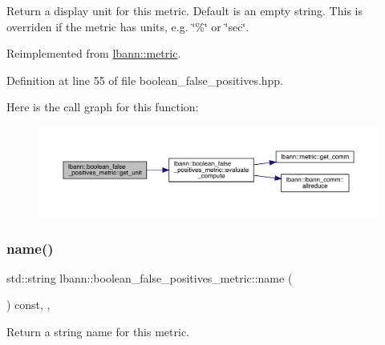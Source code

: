 Return a display unit for this metric. Default is an empty string. This is overriden if the metric has units, e.\+g. \char`\"{}\%\char`\"{} or \char`\"{}sec\char`\"{}. 

Reimplemented from \hyperlink{classlbann_1_1metric_a13fd302dec85190b877f7146529e516c}{lbann\+::metric}.



Definition at line 55 of file boolean\+\_\+false\+\_\+positives.\+hpp.


Here is the call graph for this function\+:\nopagebreak
\begin{figure}[H]
\begin{center}
\leavevmode
\includegraphics[width=350pt]{classlbann_1_1boolean__false__positives__metric_ab42b53134f128d26e3df37ca7a3d4cea_cgraph}
\end{center}
\end{figure}
\mbox{\label{classlbann_1_1boolean__false__positives__metric_aa1089643938285ab8c563e5aaccf9652}} 
\subsubsection{\texorpdfstring{name()}{name()}}
{\footnotesize\ttfamily std\+::string lbann\+::boolean\+\_\+false\+\_\+positives\+\_\+metric\+::name (\begin{DoxyParamCaption}{ }\end{DoxyParamCaption}) const\hspace{0.3cm}{\ttfamily [inline]}, {\ttfamily [override]}, {\ttfamily [virtual]}}

Return a string name for this metric. 

